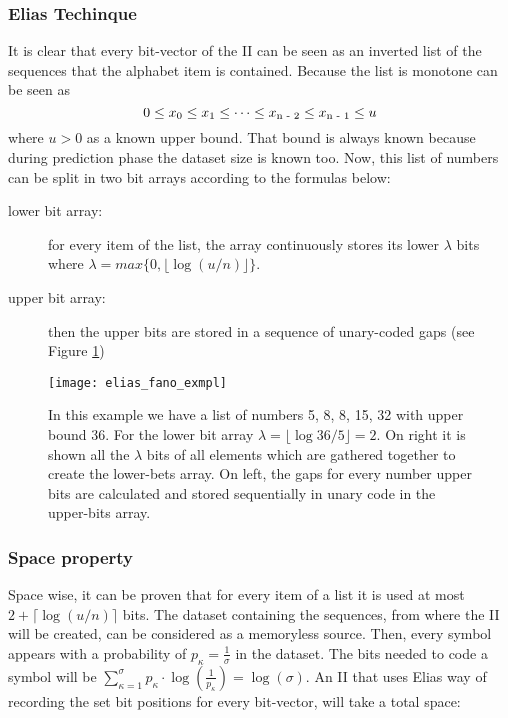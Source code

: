 \subsubsection*{Elias Techinque}
\par It is clear that every bit-vector of the II can be seen as an inverted list of the sequences that the alphabet item is contained. Because the list is monotone can be seen as \[0 \leq x\textsubscript{0} \leq x\textsubscript{1} \leq \dots \leq x\textsubscript{n - 2} \leq x\textsubscript{n - 1} \leq u \] where \(u > 0 \) as a known upper bound. That bound is always known because during prediction phase the dataset size is known too. Now, this list of numbers can be split in two bit arrays according to the formulas below:
	\begin{description}
  	\item[lower bit array:] for every item of the list, the array continuously stores its lower $\lambda$ bits where \(\lambda = max\{0, \lfloor \log(u/n)\rfloor\}\).
  	\item[upper bit array:] then the upper bits are stored in a sequence of unary-coded gaps (see Figure \ref{fig:ef_ex})
	\end{description}

\begin{figure}[h]
    \centering
    \texttt{[image: elias\_fano\_exmpl]}
    \caption{In this example we have a list of numbers 5, 8, 8, 15, 32 with upper bound 36. For the lower bit array \(\lambda = \lfloor \log36/5\rfloor = 2\). On right it is shown all the \(\lambda\) bits of all elements which are gathered together to create the lower-bets array. On left, the gaps for every number upper bits are calculated and stored sequentially in unary code in the upper-bits array.}
    \label{fig:ef_ex}
\end{figure}	
\subsubsection*{Space property}
\par Space wise, it can be proven \cite{vigna_quasi-succinct_2013} that for every item of a list it is used at most \(2 + \lceil\log(u/n)\rceil\) bits. The dataset containing the sequences, from where the II will be created, can be considered as a memoryless source. Then, every symbol appears with a probability of \(p_{\kappa} = \frac{1}{\sigma} \) in the dataset. The bits needed to code a symbol will be \( \sum_{\kappa = 1}^{\sigma} p_{\kappa} \cdot \log(\frac{1}{p_{\kappa}}) = \log(\sigma)\). An II that uses Elias way of recording the set bit positions for every bit-vector, will take a total space:

